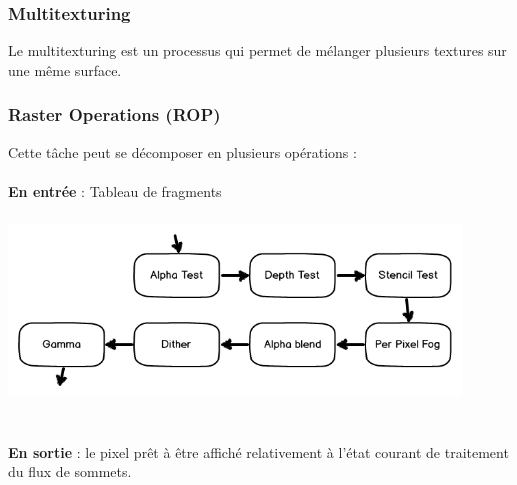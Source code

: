 \subsubsection{Multitexturing}
Le multitexturing est un processus qui permet de mélanger plusieurs textures sur une même surface.

\subsubsection{Raster Operations (ROP)}
Cette tâche peut se décomposer en plusieurs opérations :
\\\\
\textbf{En entrée} : Tableau de fragments	
\begin{center}
\includegraphics[width=12cm,height=50mm]{pipeline/images/rasterOp.png}
\end{center}
\textbf{\\En sortie} : le pixel prêt à être affiché relativement à l'état courant de traitement du flux de sommets.
\\

